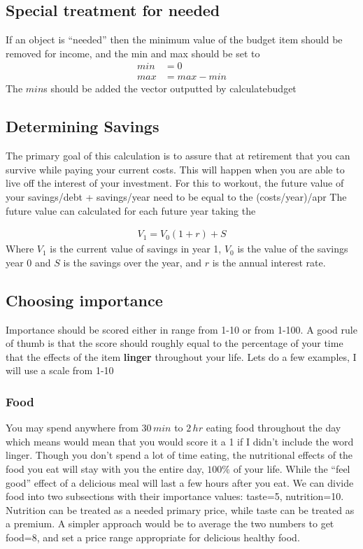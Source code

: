 \documentclass[11pt]{article}
\begin{document}
\subsection*{Special treatment for needed}
If an object is ``needed'' then the minimum value of the budget item should be
removed for income, and the min and max should be set to
\begin{align*}
  min &= 0 \\
  max &= max-min
\end{align*}
The $min$s should be added the vector outputted by calculatebudget

\newpage
\subsection*{Determining Savings}
The primary goal of this calculation is to assure that at retirement that you
can survive while paying your current costs. This will happen when you are able
to live off the interest of your investment. For this to workout, the future
value of your savings/debt + savings/year need to be equal to the (costs/year)/apr
The future value can calculated for each future year taking the 

\begin{align*}
  V_1 = V_0(1+r) + S
\end{align*}
Where $V_1$ is the current value of savings in year 1, $V_0$ is the value of the savings
year 0 and $S$ is the savings over the year, and $r$ is the annual interest rate.


\subsection*{Choosing importance}
Importance should be scored either in range from 1-10 or from 1-100. A good rule
of thumb is that the score should roughly equal to the percentage of your time
that the effects of the item \textbf{linger} throughout your life. Lets do a few
examples, I will use a scale from 1-10
\subsubsection*{Food}
You may spend anywhere from $30\,min$ to $2\,hr$ eating food throughout the day
which means would mean that you would score it a 1 if I didn't include the word
linger. Though you don't spend a lot of time eating, the nutritional effects of
the food you eat will stay with you the entire day, $100\%$ of your life. While
the ``feel good'' effect of a delicious meal will last a few hours after you
eat. We can divide food into two subsections with their importance values: taste=5, nutrition=10.
Nutrition can be treated as a needed primary price, while taste can be treated
as a premium. A simpler approach would be to average the two numbers to get
food=8, and set a price range appropriate for delicious healthy food.
\end{document}
